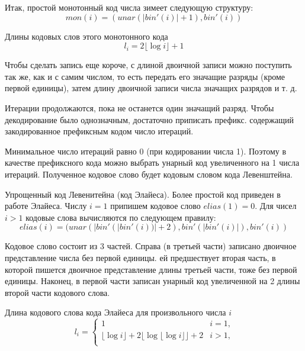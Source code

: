 \documentclass[14pt]{article}
\begin{document}
Итак, простой монотонный код числа зимеет следующую структуру:
\begin{displaymath}
    mon(i) = (unar(|bin'(i)| + 1), bin'(i))
\end{displaymath}

Длины кодовых слов этого монотонного кода
\begin{displaymath}
    l_i = 2\lfloor \log i \rfloor + 1
\end{displaymath}

Чтобы сделать запись еще короче, с длиной двоичной записи можно поступить так же, как и с самим числом, то есть передать его значащие разряды (кроме первой единицы), затем длину двоичной записи числа значащих разрядов и т. д.

Итерации продолжаются, пока не останется один значащий разряд. Чтобы декодирование было однозначным, достаточно приписать префикс. содержащий закодированное префиксным кодом число итераций.

Минимальное число итераций равно 0 (при кодировании числа 1). Поэтому в качестве префиксного кода можно выбрать унарный код увеличенного на 1 числа итераций. Полученное кодовое слово будет кодовым словом кода Левенштейна.

Упрощенный код Левенитейна (код Элайеса). Более простой код приведен в работе Элайеса. Числу \(i = 1\) припишем кодовое слово \(elias(1) = 0\). Для чисел \(i > 1\) кодовые слова вычисляются по следующем правилу:
\begin{displaymath}
    elias(i)=(unar(|bin'(|bin'(i))|+2), bin'(|bin'(i)|), bin'(i))
\end{displaymath}

Кодовое слово состоит из 3 частей. Справа (в третьей части) записано двоичное представление числа без первой единицы. ей предшествует вторая часть, в которой пишется двоичное представление длины третьей части, тоже без первой единицы. Наконец, в первой части записан унарный код увеличенной на 2 длины второй части кодового слова.

Длина кодового слова кода Элайеса для произвольного числа \(i\)
\begin{displaymath}
    l_i = \left\{ \begin{array}{ll}
        1 & \textrm{\(i = 1\),}\\
        \lfloor \log i \rfloor + 2\lfloor \log \lfloor \log i \rfloor \rfloor + 2 & \textrm{\(i > 1\),}\\
  \end{array} \right.
\end{displaymath}
\end{document}
